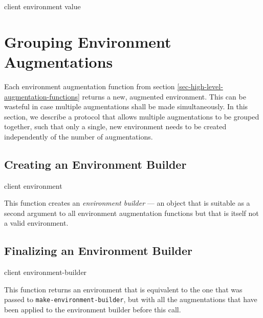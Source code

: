 {\footnotesize
{} {client environment value}
}


\section{Grouping Environment Augmentations}
\label{sec-grouping-environment-augmentations}

Each environment augmentation function from section
\ref{sec-high-level-augmentation-functions} returns a new, augmented
environment.  This can be wasteful in case multiple augmentations shall be
made simultaneously.  In this section, we describe a protocol that allows
multiple augmentations to be grouped together, such that only a single, new
environment needs to be created independently of the number of
augmentations.

\subsection{Creating an Environment Builder}

{\footnotesize
{} {client environment}
}

This function creates an \emph{environment builder} --- an object that is
suitable as a second argument to all environment augmentation functions but
that is itself not a valid environment.

\subsection{Finalizing an Environment Builder}

{\footnotesize
{} {client environment-builder}
}

This function returns an environment that is equivalent to the one that was
passed to \texttt{make-environment-builder}, but with all the augmentations
that have been applied to the environment builder before this call.
